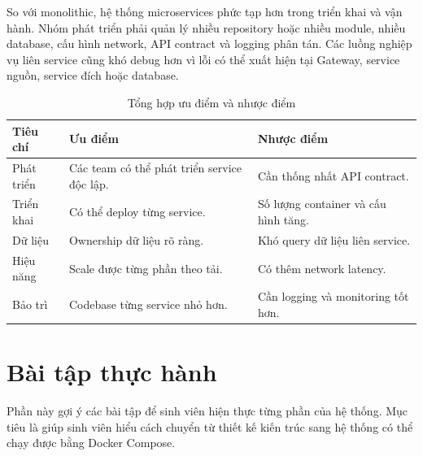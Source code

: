 \documentclass[../main.tex]{subfiles}
\begin{document}
So với monolithic, hệ thống microservices phức tạp hơn trong triển khai và vận hành. Nhóm phát triển phải quản lý nhiều repository hoặc nhiều module, nhiều database, cấu hình network, API contract và logging phân tán. Các luồng nghiệp vụ liên service cũng khó debug hơn vì lỗi có thể xuất hiện tại Gateway, service nguồn, service đích hoặc database.

\begin{table}[H]
    \centering
    \caption{Tổng hợp ưu điểm và nhược điểm}
    \label{tab:chapter4-pros-cons}
    \begin{tabular}{|p{}|p{}|p{}|}
        \hline
        \rowcolor{primary!35}
        \textbf{Tiêu chí} & \textbf{Ưu điểm} & \textbf{Nhược điểm} \\
        \hline
        Phát triển & Các team có thể phát triển service độc lập. & Cần thống nhất API contract. \\
        \hline
        Triển khai & Có thể deploy từng service. & Số lượng container và cấu hình tăng. \\
        \hline
        Dữ liệu & Ownership dữ liệu rõ ràng. & Khó query dữ liệu liên service. \\
        \hline
        Hiệu năng & Scale được từng phần theo tải. & Có thêm network latency. \\
        \hline
        Bảo trì & Codebase từng service nhỏ hơn. & Cần logging và monitoring tốt hơn. \\
        \hline
    \end{tabular}
\end{table}

\section{Bài tập thực hành}
\label{section:4.11}

Phần này gợi ý các bài tập để sinh viên hiện thực từng phần của hệ thống. Mục tiêu là giúp sinh viên hiểu cách chuyển từ thiết kế kiến trúc sang hệ thống có thể chạy được bằng Docker Compose.
\end{document}
